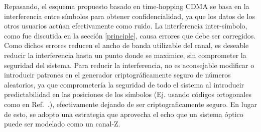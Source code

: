 Repasando, el esquema propuesto basado en time-hopping CDMA se basa en la interferencia entre símbolos para obtener confidencialidad, ya que los datos de los otros usuarios actúan efectivamente como ruido.
La interferencia inter-símbolo, como fue discutida en la sección \ref{principle}, causa errores que debe ser corregidos. Como dichos errores reducen el ancho de banda utilizable del canal, es deseable reducir la interferencia hasta un punto donde se maximice, sin comprometer la seguridad del sistema. Para reducir la interferencia, no es aconsejable modificar o introducir patrones en el generador criptográficamente seguro de números aleatorios, ya que comprometería la seguridad de todo el sistema al introducir predictabilidad en las posiciones de los símbolos (Ej. usando códigos ortogonales como en Ref.~\cite{Nadarajah2006}.), efectivamente dejando de ser criptograficamente seguro.
En lugar de esto, se adopto una estrategia que aprovecha el echo que un sistema óptico puede ser modelado como un canal-Z.



